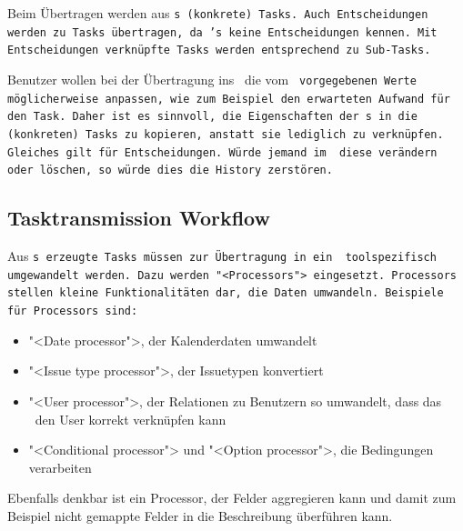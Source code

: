 				Beim Übertragen werden aus \tt s (konkrete) Tasks.
				Auch Entscheidungen werden zu Tasks übertragen, da \ppt's keine Entscheidungen kennen.
				Mit Entscheidungen verknüpfte Tasks werden entsprechend zu Sub-Tasks.
				
				Benutzer wollen bei der Übertragung ins \ppt\ die vom \tt\ vorgegebenen Werte möglicherweise anpassen, wie zum Beispiel den erwarteten Aufwand für den Task.
				Daher ist es sinnvoll, die Eigenschaften der \tt s in die (konkreten) Tasks zu kopieren, anstatt sie lediglich zu verknüpfen.
				Gleiches gilt für Entscheidungen. Würde jemand im \dks\ diese verändern oder löschen,
				so würde dies die History zerstören.
			
		
		\subsection{Tasktransmission Workflow}
			Aus \tt s erzeugte Tasks müssen zur Übertragung in ein \ppt\
			toolspezifisch umgewandelt werden. Dazu werden "<Processors"> eingesetzt.
			Processors stellen kleine Funktionalitäten dar, die Daten umwandeln.
			Beispiele für Processors sind:
			\begin{itemize}
				\item "<Date processor">, der Kalenderdaten umwandelt
				\item "<Issue type processor">, der Issuetypen konvertiert
				\item "<User processor">, der Relationen zu Benutzern so umwandelt, dass das \ppt\ den User korrekt verknüpfen kann
				\item "<Conditional processor"> und "<Option processor">, die Bedingungen verarbeiten
			\end{itemize}
			Ebenfalls denkbar ist ein Processor, der Felder aggregieren kann und damit zum Beispiel nicht gemappte Felder in die Beschreibung überführen kann.
			
